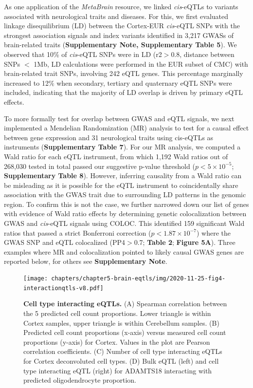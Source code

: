 As one application of the \emph{MetaBrain} resource, we linked \emph{cis}-eQTLs to variants associated with neurological traits and diseases. For this, we first evaluated linkage disequilibrium (LD) between the Cortex-EUR \emph{cis}-eQTL SNPs with the strongest association signals and index variants identified in 3,217 GWASs of brain-related traits (\textbf{Supplementary Note, Supplementary Table 5}). We observed that 10\% of \emph{cis}-eQTL SNPs were in LD (r2$>$0.8, distance between SNPs $<$ 1Mb, LD calculations were performed in the EUR subset of CMC) with brain-related trait SNPs, involving 242 eQTL genes. This percentage marginally increased to 12\% when secondary, tertiary and quaternary eQTL SNPs were included, indicating that the majority of LD overlap is driven by primary eQTL effects. 

To more formally test for overlap between GWAS and eQTL signals, we next implemented a Mendelian Randomization (MR) analysis to test for a causal effect between gene expression and 31 neurological traits using cis-eQTLs as instruments (\textbf{Supplementary Table 7}).  For our MR analysis, we computed a Wald ratio for each eQTL instrument, from which 1,192 Wald ratios out of 268,030 tested in total passed our suggestive p-value threshold ($p<5 \times 10^{-5}$; \textbf{Supplementary Table 8}). However, inferring causality from a Wald ratio can be misleading as it is possible for the eQTL instrument to coincidentally share association with the GWAS trait due to surrounding LD patterns in the genomic region.  To confirm this is not the case, we further narrowed down our list of genes with evidence of Wald ratio effects by determining genetic colocalization between GWAS and \emph{cis}-eQTL signals using COLOC\cite{BayesianTestColocalisation}. This identified 159 significant Wald ratios that passed a strict Bonferroni correction ($p<1.87 \times 10^{-7}$) where the GWAS SNP and eQTL colocalized (PP4$>$0.7; \textbf{Table 2}; \textbf{Figure 5A}). Three examples where MR and colocalization pointed to likely causal GWAS genes are reported below, for others see \textbf{Supplementary Note}. 

\begin{figure}[H]
	\texttt{[image: chapters/chapter5-brain-eqtls/img/2020-11-25-fig4-interactionqtls-v8.pdf]}
	\caption{\textbf{Cell type interacting eQTLs.} (A) Spearman correlation between the 5 predicted cell count proportions. Lower triangle is within Cortex samples, upper triangle is within Cerebellum samples. (B) Predicted cell count proportions (x-axis) versus measured cell count proportions (y-axis) for Cortex. Values in the plot are Pearson correlation coefficients. (C) Number of cell type interacting eQTLs for Cortex deconvoluted cell types. (D) Bulk eQTL (left) and cell type interacting eQTL (right) for ADAMTS18 interacting with predicted oligodendrocyte proportion.}
	\end{figure}


